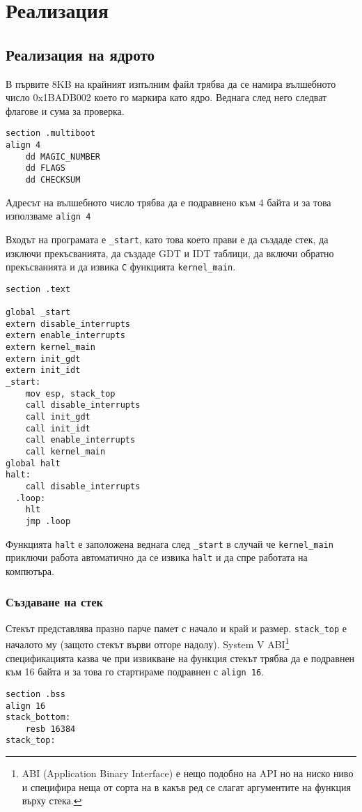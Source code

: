 \section{Реализация}
\subsection{Реализация на ядрото}
В първите 8KB на крайният изпълним файл трябва да се намира вълшебното число 0x1BADB002 което го маркира като ядро. Веднага след него следват флагове и сума за проверка.
\begin{lstlisting}
section .multiboot
align 4
    dd MAGIC_NUMBER
    dd FLAGS
    dd CHECKSUM
\end{lstlisting}                                                                                                                                 Адресът на вълшебното число трябва да е подравнено към 4 байта и за това използваме {\tt align 4}

Входът на програмата е {\tt \_start}, като това което прави е да създаде стек, да изключи прекъсванията, да създаде GDT и IDT таблици, да включи обратно прекъсванията и да извика {\tt C} функцията {\tt kernel\_main}.
\begin{lstlisting}
section .text

global _start
extern disable_interrupts
extern enable_interrupts
extern kernel_main
extern init_gdt
extern init_idt
_start:
    mov esp, stack_top
    call disable_interrupts
    call init_gdt
    call init_idt
    call enable_interrupts
    call kernel_main
global halt
halt:
    call disable_interrupts
  .loop:
    hlt
    jmp .loop
\end{lstlisting}
Функцията {\tt halt} е заположена веднага след {\tt \_start} в случай че {\tt kernel\_main} приключи работа автоматично да се извика {\tt halt} и да спре работата на компютъра.

\subsubsection{Създаване на стек}
Стекът представлява празно парче памет с начало и край и размер. {\tt stack\_top} е началото му (защото стекът върви отгоре надолу). System V ABI\footnote{ABI (Application Binary Interface) е нещо подобно на API но на ниско ниво и специфира неща от сорта на в какъв ред се слагат аргументите на функция върху стека.} спецификацията казва че при извикване на функция стекът трябва да е подравнен към 16 байта и за това го стартираме подравнен с {\tt align 16}.
\begin{lstlisting}
section .bss
align 16
stack_bottom:
    resb 16384
stack_top:
\end{lstlisting}

